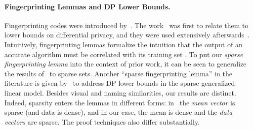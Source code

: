 \paragraph{Fingerprinting Lemmas and DP Lower Bounds.}
Fingerprinting codes were introduced by~\cite{boneh1998collusion}. The work~\cite{ullman2013answering} was first to relate them to lower bounds on differential privacy, and they were used extensively afterwards~\citep{bun2014fingerprinting,dwork2015robust, bun2017make,steinke2017tight,kamath2018privately,cai2023score,kamath2022new,peter2024smooth}. Intuitively, fingerprinting lemmas formalize the intuition that the output of an accurate algorithm must be correlated with its training set \citep{dwork2015robust,steinke2016upper,bun2017make,steinke2017tight,kamath2018privately,cai2023score,kamath2022new,peter2024smooth}. To put our \emph{sparse fingerprinting lemma} into the context of prior work, it can be seen to generalize the results of~\citep{steinke2017tight} to sparse sets. 
Another ``sparse fingerprinting lemma'' in the literature is given by~\cite{cai2023score} to address DP lower bounds in the sparse generalized linear model. Besides visual and naming similarities, our results are distinct. Indeed, sparsity enters the lemmas in different forms: in~\cite{cai2023score} the \emph{mean vector} is sparse (and data is dense), and in our case, the mean is dense and the \emph{data vectors} are sparse. The proof techniques also differ substantially.